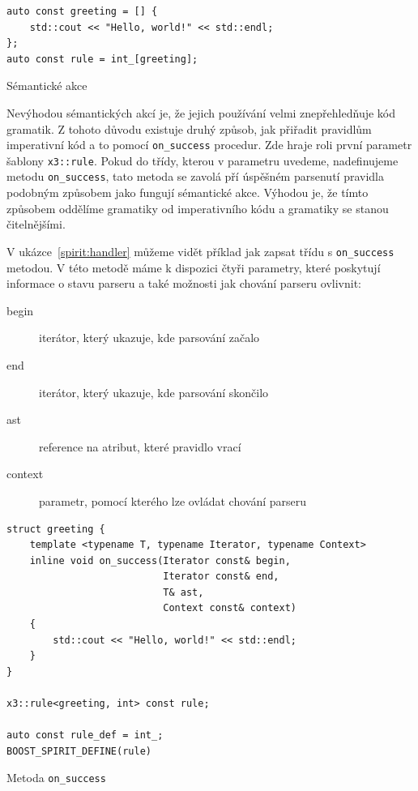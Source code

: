 \documentclass[thesis=B,czech,hidelinks]{FITthesis}[2019/03/06]
\begin{document}
\begin{listing}
\begin{verbatim}
auto const greeting = [] {
    std::cout << "Hello, world!" << std::endl;
};
auto const rule = int_[greeting];
\end{verbatim}
\caption{Sémantické akce}\label{spirit:semantic}
\end{listing}

Nevýhodou sémantických akcí je, že jejich používání velmi znepřehledňuje kód gramatik. Z tohoto důvodu existuje druhý způsob, jak přiřadit pravidlům imperativní kód a to pomocí \verb¨on_success¨ procedur. Zde hraje roli první parametr šablony \texttt{x3::rule}. Pokud do třídy, kterou v parametru uvedeme, nadefinujeme metodu \verb¨on_success¨, tato metoda se zavolá pří úspěšném parsenutí pravidla podobným způsobem jako fungují sémantické akce. Výhodou je, že tímto způsobem oddělíme gramatiky od imperativního kódu a gramatiky se stanou čitelnějšími.

V ukázce~\ref{spirit:handler} můžeme vidět příklad jak zapsat třídu s \verb¨on_success¨ metodou. V této metodě máme k dispozici čtyři parametry, které poskytují informace o stavu parseru a také možnosti jak chování parseru ovlivnit:
\begin{description}
    \item[begin]{iterátor, který ukazuje, kde parsování začalo}
    \item[end]{iterátor, který ukazuje, kde parsování skončilo}
    \item[ast]{reference na atribut, které pravidlo vrací}
    \item[context]{parametr, pomocí kterého lze ovládat chování parseru}
\end{description}

\begin{listing}
\begin{verbatim}
struct greeting {
    template <typename T, typename Iterator, typename Context>
    inline void on_success(Iterator const& begin,
                           Iterator const& end,
                           T& ast,
                           Context const& context)
    {
        std::cout << "Hello, world!" << std::endl;
    }
}

x3::rule<greeting, int> const rule;

auto const rule_def = int_;
BOOST_SPIRIT_DEFINE(rule)
\end{verbatim}
\caption{Metoda \texttt{on\_success}}\label{spirit:handler}
\end{listing}
\end{document}
